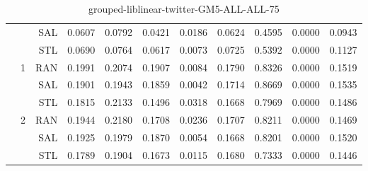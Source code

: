\begin{center}
\begin{table}[htbp]
\begin{center}
\begin{tabular}{ | r | r | r | r | r | r | r | r | r | r | r |}
 &   & SAL & 0.0607 & 0.0792 & 0.0421 & 0.0186 & 0.0624 & 0.4595 & 0.0000 & 0.0943\\ \cline{3-11}
 &   & STL & 0.0690 & 0.0764 & 0.0617 & 0.0073 & 0.0725 & 0.5392 & 0.0000 & 0.1127\\ \cline{2-11}
 & \multirow{3}{*}{1} & RAN & 0.1991 & 0.2074 & 0.1907 & 0.0084 & 0.1790 & 0.8326 & 0.0000 & 0.1519\\ \cline{3-11}
 &   & SAL & 0.1901 & 0.1943 & 0.1859 & 0.0042 & 0.1714 & 0.8669 & 0.0000 & 0.1535\\ \cline{3-11}
 &   & STL & 0.1815 & 0.2133 & 0.1496 & 0.0318 & 0.1668 & 0.7969 & 0.0000 & 0.1486\\ \cline{2-11}
 & \multirow{3}{*}{2} & RAN & 0.1944 & 0.2180 & 0.1708 & 0.0236 & 0.1707 & 0.8211 & 0.0000 & 0.1469\\ \cline{3-11}
 &   & SAL & 0.1925 & 0.1979 & 0.1870 & 0.0054 & 0.1668 & 0.8201 & 0.0000 & 0.1520\\ \cline{3-11}
 &   & STL & 0.1789 & 0.1904 & 0.1673 & 0.0115 & 0.1680 & 0.7333 & 0.0000 & 0.1446\\ \cline{2-11}
\hline
\end{tabular}
\caption{grouped-liblinear-twitter-GM5-ALL-ALL-75}
\end{center}
 \end{table}
\end{center}

